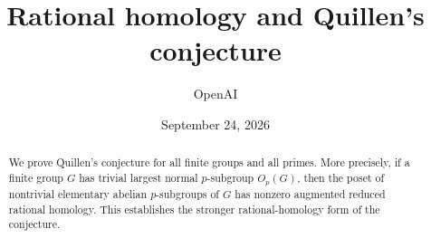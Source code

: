 \documentclass[11pt]{article}
\title{Rational homology and Quillen's conjecture}
\author{OpenAI}
\date{September 24, 2026}
\theoremstyle{definition}
\theoremstyle{remark}
\begin{document}
\maketitle
\begin{abstract}
We prove Quillen's conjecture for all finite groups and all primes.
More precisely, if a finite group $G$ has trivial largest normal
$p$-subgroup $O_p(G)$, then the poset of nontrivial elementary abelian
$p$-subgroups of $G$ has nonzero augmented reduced rational homology.
This establishes the stronger rational-homology form of the conjecture.
\end{abstract}
\tableofcontents











{}
\begingroup
\raggedright

\endgroup
\end{document}
